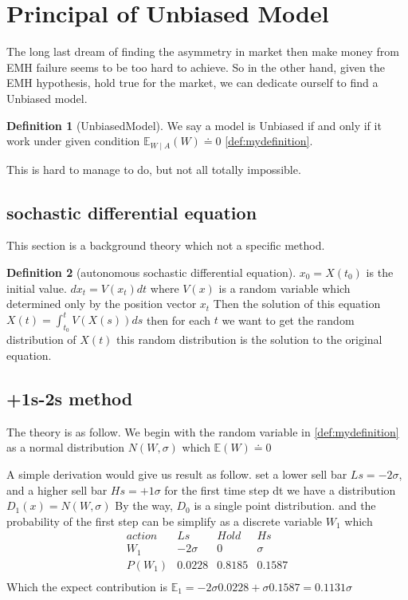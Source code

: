 \documentclass{article}
\theoremstyle{definition} %
\newtheorem{definition}{Definition}[section]
\begin{document}
\section{Principal of Unbiased Model}
The long last dream of finding the asymmetry
in market then make money from EMH failure
seems to be too hard to achieve.
So in the other hand, given the EMH hypothesis,
hold true for the market, we can dedicate
ourself to find a Unbiased model.

\begin{definition}[UnbiasedModel]
    \label{def:UnbiasedModel}
    We say a model is Unbiased if and
    only if it work under given condition
    $\mathbb{E}_{W\mid A}(W)\doteq 0$
    \ref{def:mydefinition}.
\end{definition}

This is hard to manage to do, but not all totally
impossible.
\subsection{sochastic differential equation}
This section is a background theory which not
a specific method.
\begin{definition}[autonomous sochastic differential equation]
    \label{def:aSDE}
    $x_0=X(t_0)$ is the initial value.
    $dx_t=V(x_t)dt$
    where $V(x)$ is a random variable
    which determined only by the position
    vector $x_t$
    Then the solution of this equation
    $X(t)=\int_{t_0}^tV(X(s))ds$
    then for each $t$
    we want to get the random distribution of
    $X(t)$ this random distribution is
    the solution to the original equation.
\end{definition}

\subsection{+1s-2s method}
The theory is as follow.
We begin with the random variable in
\ref{def:mydefinition} as a normal distribution
$N(W,\sigma)$ which $\mathbb{E}(W)\doteq 0$

A simple derivation would give us result as follow.
set a lower sell bar $Ls=-2\sigma$,
and a higher sell bar $Hs=+1\sigma$
for the first time step dt we have a distribution
$D_1(x)=N(W,\sigma)$
By the way, $D_0$ is a single point distribution.
and the probability of the first step can
be simplify as a discrete variable $W_1$ which
$$
    \begin{array}{c|ccc}
        action & Ls       & Hold   & Hs     \\
        W_1    & -2\sigma & 0      & \sigma \\
        \hline
        P(W_1) & 0.0228   & 0.8185 & 0.1587 \\
    \end{array}
$$
Which the expect contribution is
$\mathbb{E}_1
    =-2\sigma0.0228+\sigma0.1587
    =0.1131\sigma$
\end{document}
